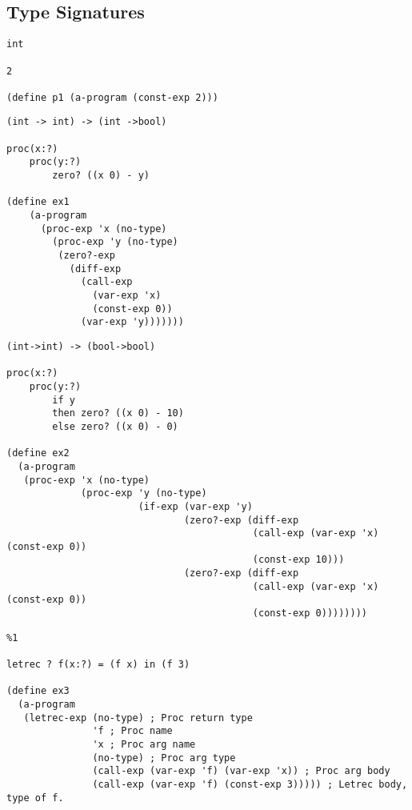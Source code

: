 \documentclass[../main.tex]{subfiles}
\begin{document}
\subsection{Type Signatures}

\begin{lstlisting}
int

2

(define p1 (a-program (const-exp 2)))
\end{lstlisting}


\begin{lstlisting}
(int -> int) -> (int ->bool)

proc(x:?)
    proc(y:?)
        zero? ((x 0) - y)

(define ex1
    (a-program
      (proc-exp 'x (no-type)
        (proc-exp 'y (no-type)
         (zero?-exp
           (diff-exp
             (call-exp
               (var-exp 'x)
               (const-exp 0))
             (var-exp 'y)))))))
\end{lstlisting}

\begin{lstlisting}
(int->int) -> (bool->bool)

proc(x:?)
    proc(y:?)
        if y
        then zero? ((x 0) - 10)
        else zero? ((x 0) - 0)

(define ex2
  (a-program
   (proc-exp 'x (no-type)
             (proc-exp 'y (no-type)
                       (if-exp (var-exp 'y)
                               (zero?-exp (diff-exp
                                           (call-exp (var-exp 'x) (const-exp 0))
                                           (const-exp 10)))
                               (zero?-exp (diff-exp
                                           (call-exp (var-exp 'x) (const-exp 0))
                                           (const-exp 0))))))))
\end{lstlisting}

\begin{lstlisting}
%1

letrec ? f(x:?) = (f x) in (f 3)

(define ex3
  (a-program
   (letrec-exp (no-type) ; Proc return type
               'f ; Proc name
               'x ; Proc arg name
               (no-type) ; Proc arg type
               (call-exp (var-exp 'f) (var-exp 'x)) ; Proc arg body
               (call-exp (var-exp 'f) (const-exp 3))))) ; Letrec body, type of f.

\end{lstlisting}
\end{document}
